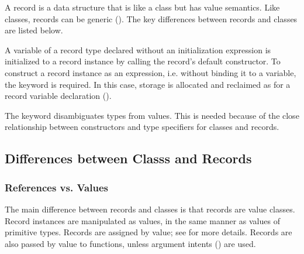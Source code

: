 \label{Records}

A record is a data structure that is like a class but has value
semantics.  Like classes, records can be generic ().
The key differences between records and classes are listed below.

A variable of a record type declared without an initialization expression
is initialized to a record instance by calling the record's default constructor.
To construct a record instance as an expression,
i.e. without binding it to a variable, the  keyword is
required.  In this case, storage is allocated and reclaimed as for a record
variable declaration ().
\begin{rationale}
The  keyword disambiguates types from values. This is needed because of the close
relationship between constructors and type specifiers for classes and
records.
\end{rationale}

\subsection{Differences between Classs and Records}
\label{Class_and_Record_Differences}

\subsubsection{References vs. Values}
\label{Records_as_Value_Classes}

The main difference between records and classes is that records are
value classes.  Record instances are manipulated as values, in the
same manner as values of primitive types.  Records are assigned by value;
see  for more details.  Records are also passed
by value to functions, unless argument intents () are used.

